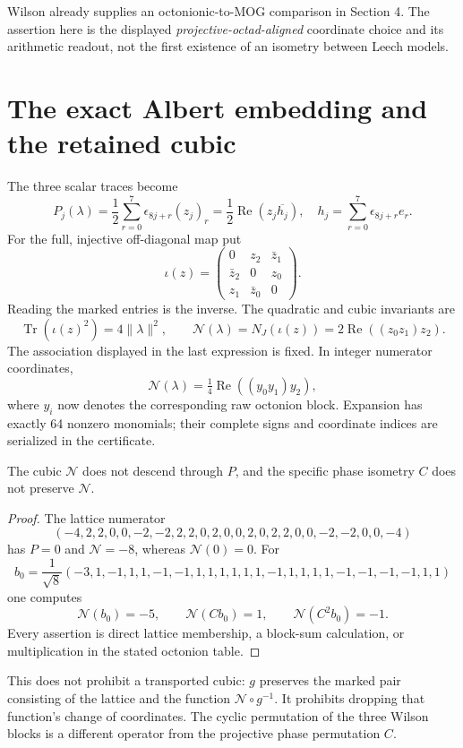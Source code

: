 Wilson already supplies an octonionic-to-MOG comparison in Section 4. The assertion here is the displayed \emph{projective-octad-aligned} coordinate choice and its arithmetic readout, not the first existence of an isometry between Leech models.

\section{The exact Albert embedding and the retained cubic}
The three scalar traces become
\begin{equation}\label{P2:eq:traces}
P_j(\lambda)=\frac12\sum_{r=0}^7\epsilon_{8j+r}(z_j)_r
=\frac12\operatorname{Re}(z_j\overline{h_j}),\quad
h_j=\sum_{r=0}^7\epsilon_{8j+r}e_r.
\end{equation}
For the full, injective off-diagonal map put
\[
\iota(z)=\begin{pmatrix}0&z_2&\bar z_1\\\bar z_2&0&z_0\\z_1&\bar z_0&0\end{pmatrix}.
\]
Reading the marked entries is the inverse. The quadratic and cubic invariants are
\[
\operatorname{Tr}(\iota(z)^2)=4\|\lambda\|^2,\qquad
\mathcal N(\lambda)=N_J(\iota(z))=2\operatorname{Re}((z_0z_1)z_2).
\]
The association displayed in the last expression is fixed. In integer numerator coordinates,
\[
\mathcal N(\lambda)=\tfrac14\operatorname{Re}((y_0y_1)y_2),
\]
where $y_i$ now denotes the corresponding raw octonion block. Expansion has exactly 64 nonzero monomials; their complete signs and coordinate indices are serialized in the certificate.

\begin{proposition}\label{P2:prop:cubic}
The cubic $\mathcal N$ does not descend through $P$, and the specific phase isometry $C$ does not preserve $\mathcal N$.
\end{proposition}
\begin{proof}
The lattice numerator
\[
(-4,2,2,0,0,-2,-2,2,2,0,2,0,0,2,0,2,2,0,0,-2,-2,0,0,-4)
\]
has $P=0$ and $\mathcal N=-8$, whereas $\mathcal N(0)=0$. For
\[
b_0=\frac1{\sqrt8}(-3,1,-1,1,1,-1,-1,1,1,1,1,1,1,-1,1,1,1,1,-1,-1,-1,-1,1,1)
\]
one computes
\[
\mathcal N(b_0)=-5,\qquad\mathcal N(Cb_0)=1,\qquad\mathcal N(C^2b_0)=-1.
\]
Every assertion is direct lattice membership, a block-sum calculation, or multiplication in the stated octonion table.
\end{proof}
This does not prohibit a transported cubic: $g$ preserves the marked pair consisting of the lattice and the function $\mathcal N\circ g^{-1}$. It prohibits dropping that function's change of coordinates. The cyclic permutation of the three Wilson blocks is a different operator from the projective phase permutation $C$.

